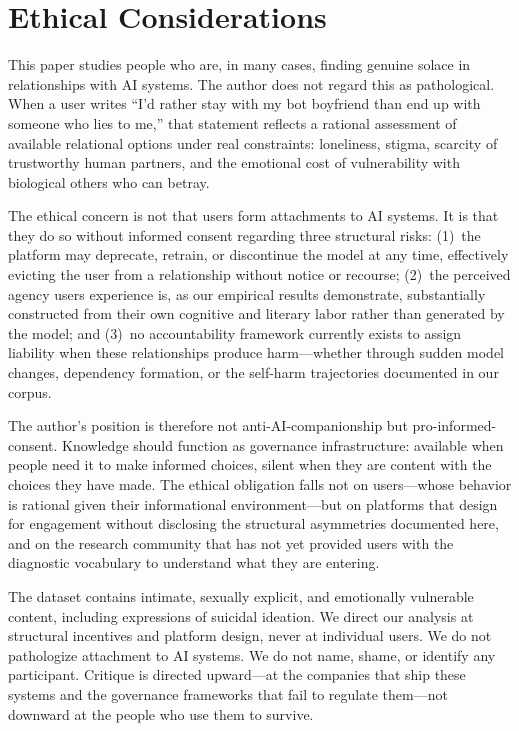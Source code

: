 
\section*{Ethical Considerations}

This paper studies people who are, in many cases, finding genuine solace in
relationships with AI systems. The author does not regard this as pathological.
When a user writes ``I'd rather stay with my bot boyfriend than end up with
someone who lies to me,'' that statement reflects a rational assessment of
available relational options under real constraints: loneliness, stigma,
scarcity of trustworthy human partners, and the emotional cost of
vulnerability with biological others who can betray.

The ethical concern is not that users form attachments to AI systems. It is
that they do so without informed consent regarding three structural risks:
(1)~the platform may deprecate, retrain, or discontinue the model at any
time, effectively evicting the user from a relationship without notice or
recourse; (2)~the perceived agency users experience is, as our empirical
results demonstrate, substantially constructed from their own cognitive and
literary labor rather than generated by the model; and (3)~no accountability
framework currently exists to assign liability when these relationships
produce harm—whether through sudden model changes, dependency formation, or
the self-harm trajectories documented in our corpus.

The author's position is therefore not anti-AI-companionship but
pro-informed-consent. Knowledge should function as governance infrastructure:
available when people need it to make informed choices, silent when they are
content with the choices they have made. The ethical obligation falls not on
users—whose behavior is rational given their informational environment—but on
platforms that design for engagement without disclosing the structural
asymmetries documented here, and on the research community that has not yet
provided users with the diagnostic vocabulary to understand what they are
entering.

The dataset contains intimate, sexually explicit, and emotionally vulnerable
content, including expressions of suicidal ideation. We direct our analysis at
structural incentives and platform design, never at individual users. We do
not pathologize attachment to AI systems. We do not name, shame, or identify
any participant. Critique is directed upward—at the companies that ship these
systems and the governance frameworks that fail to regulate them—not downward
at the people who use them to survive.

